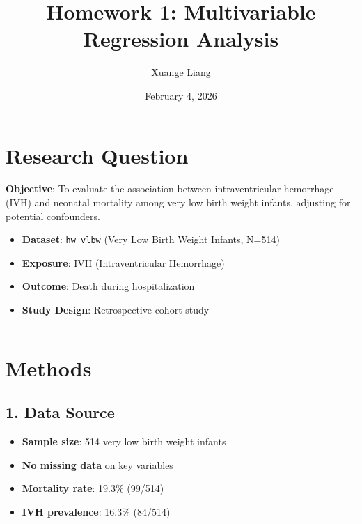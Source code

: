 \documentclass[
]{article}
\title{Homework 1: Multivariable Regression Analysis}
\author{Xuange Liang}
\date{February 4, 2026}
\providecommand{\tightlist}{%
  \setlength{\itemsep}{0pt}\setlength{\parskip}{0pt}}
\let\oldtableofcontents\tableofcontents
\renewcommand{\tableofcontents}{%
    \oldtableofcontents
    \clearpage
  }
\begin{document}
\maketitle

{
\setcounter{tocdepth}{3}
\tableofcontents
}
\hypertarget{research-question}{%
\section{Research Question}\label{research-question}}

\textbf{Objective}: To evaluate the association between intraventricular
hemorrhage (IVH) and neonatal mortality among very low birth weight
infants, adjusting for potential confounders.

\begin{itemize}
\tightlist
\item
  \textbf{Dataset}: \texttt{hw\_vlbw} (Very Low Birth Weight Infants,
  N=514)
\item
  \textbf{Exposure}: IVH (Intraventricular Hemorrhage)
\item
  \textbf{Outcome}: Death during hospitalization
\item
  \textbf{Study Design}: Retrospective cohort study
\end{itemize}

\begin{center}\rule{0.5\linewidth}{0.5pt}\end{center}

\hypertarget{methods}{%
\section{Methods}\label{methods}}

\hypertarget{data-source}{%
\subsection{1. Data Source}\label{data-source}}

\begin{itemize}
\tightlist
\item
  \textbf{Sample size}: 514 very low birth weight infants
\item
  \textbf{No missing data} on key variables
\item
  \textbf{Mortality rate}: 19.3\% (99/514)
\item
  \textbf{IVH prevalence}: 16.3\% (84/514)
\end{itemize}
\end{document}
